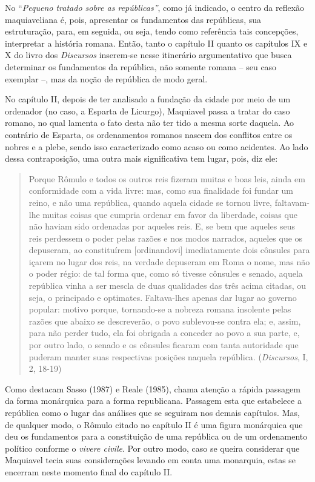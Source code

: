 No ``\emph{Pequeno tratado sobre as repúblicas''}, como já indicado, o
centro da reflexão maquiaveliana é, pois, apresentar os fundamentos das
repúblicas, sua estruturação, para, em seguida, ou seja, tendo como
referência tais concepções, interpretar a história romana. Então, tanto
o capítulo II quanto os capítulos IX e X do livro dos \emph{Discursos}
inserem-se nesse itinerário argumentativo que busca determinar os
fundamentos da república, não somente romana -- seu caso exemplar --,
mas da noção de república de modo geral.

No capítulo II, depois de ter analisado a fundação da cidade por meio de
um ordenador (no caso, a Esparta de Licurgo), Maquiavel passa a tratar
do caso romano, no qual lamenta o fato desta não ter tido a mesma sorte
daquela. Ao contrário de Esparta, os ordenamentos romanos nascem dos
conflitos entre os nobres e a plebe, sendo isso caracterizado como acaso
ou como acidentes. Ao lado dessa contraposição, uma outra mais
significativa tem lugar, pois, diz ele:

\begin{quote}
Porque Rômulo e todos os outros reis fizeram muitas e boas leis, ainda
em conformidade com a vida livre: mas, como sua finalidade foi fundar um
reino, e não uma república, quando aquela cidade se tornou livre,
faltavam-lhe muitas coisas que cumpria ordenar em favor da liberdade,
coisas que não haviam sido ordenadas por aqueles reis. E, se bem que
aqueles seus reis perdessem o poder pelas razões e nos modos narrados,
aqueles que os depuseram, ao constituírem {[}ordinandovi{]}
imediatamente dois cônsules para içarem no lugar dos reis, na verdade
depuseram em Roma o nome, mas não o poder régio: de tal forma que, como
só tivesse cônsules e senado, aquela república vinha a ser mescla de
duas qualidades das três acima citadas, ou seja, o principado e
optimates. Faltava-lhes apenas dar lugar ao governo popular: motivo
porque, tornando-se a nobreza romana insolente pelas razões que abaixo
se descreverão, o povo sublevou-se contra ela; e, assim, para não perder
tudo, ela foi obrigada a conceder ao povo a sua parte, e, por outro
lado, o senado e os cônsules ficaram com tanta autoridade que puderam
manter suas respectivas posições naquela república. (\emph{Discursos},
I, 2, 18-19)
\end{quote}

Como destacam Sasso (1987) e Reale (1985), chama atenção a rápida
passagem da forma monárquica para a forma republicana. Passagem esta que
estabelece a república como o lugar das análises que se seguiram nos
demais capítulos. Mas, de qualquer modo, o Rômulo citado no capítulo II
é uma figura monárquica que deu os fundamentos para a constituição de
uma república ou de um ordenamento político conforme o \emph{vivere
civile}. Por outro modo, caso se queira considerar que Maquiavel tecia
suas considerações levando em conta uma monarquia, estas se encerram
neste momento final do capítulo II.

